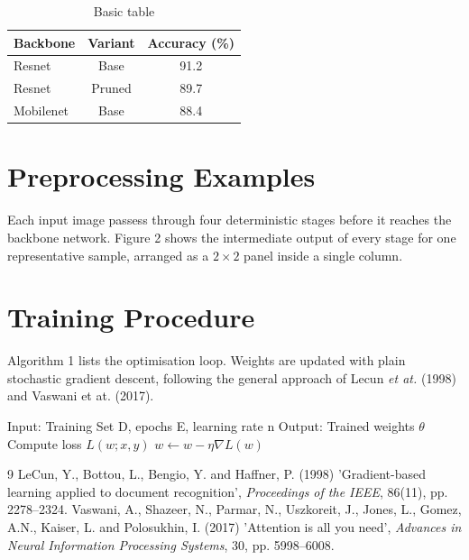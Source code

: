 \documentclass[twocolumn]{article}
\begin{document}
\begin{table}[H]
    \centering
    \caption{Basic table}
    \label{tab:basic}
    \begin{tabular}{lcc}
        \toprule
        Backbone & Variant & Accuracy (\%) \\
        \midrule
        Resnet & Base & 91.2 \\
        Resnet & Pruned & 89.7 \\
        Mobilenet & Base & 88.4 \\
        \bottomrule
    \end{tabular}
\end{table}

\section{Preprocessing Examples}
Each input image passess through four deterministic stages before it reaches the backbone network. Figure 2 
shows the intermediate output of every stage for one representative sample, arranged as a $2\times2$ panel inside a single column.


\section{Training Procedure}
Algorithm 1 lists the optimisation loop. Weights are updated with plain stochastic gradient descent, following the general approach of Lecun \textit{et at.} (1998) and Vaswani {et at.} (2017).\\




\begin{algorithm}[H]
    \caption{Model Training}
    \label{alg:sgd}
    \begin{algorithmic}
        \STATE Input: Training Set D, epochs E, learning rate n
        \STATE Output: Trained weights $\theta$
                \STATE Compute loss $L(w; x, y)$
                \STATE $w \gets w - \eta \nabla L(w)$
            \ENDFOR
        \ENDFOR
    \end{algorithmic}
\end{algorithm}


\begin{thebibliography}{9}
     LeCun, Y., Bottou, L., Bengio, Y. and Haffner, P. (1998) 'Gradient-based learning applied to document recognition', \textit{Proceedings of the IEEE}, 86(11), pp. 2278--2324.
     Vaswani, A., Shazeer, N., Parmar, N., Uszkoreit, J., Jones, L., Gomez, A.N., Kaiser, L. and Polosukhin, I. (2017) 'Attention is all you need', \textit{Advances in Neural Information Processing Systems}, 30, pp. 5998--6008.
\end{thebibliography}
\end{document}
